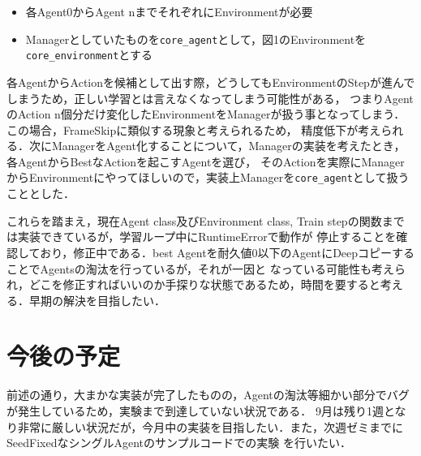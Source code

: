 \documentclass[11pt,a4paper]{jsarticle}
\begin{document}
\begin{itemize}
  \item 各Agent0からAgent nまでそれぞれにEnvironmentが必要
  \item Managerとしていたものを\texttt{core\_agent}として，図1のEnvironmentを\texttt{core\_environment}とする
\end{itemize}

各AgentからActionを候補として出す際，どうしてもEnvironmentのStepが進んでしまうため，正しい学習とは言えなくなってしまう可能性がある，
つまりAgentのAction n個分だけ変化したEnvironmentをManagerが扱う事となってしまう．この場合，FrameSkipに類似する現象と考えられるため，
精度低下が考えられる．次にManagerをAgent化することについて，Managerの実装を考えたとき，各AgentからBestなActionを起こすAgentを選び，
そのActionを実際にManagerからEnvironmentにやってほしいので，実装上Managerを\texttt{core\_agent}として扱うこととした．\par
これらを踏まえ，現在Agent class及びEnvironment class, Train stepの関数までは実装できているが，学習ループ中にRuntimeErrorで動作が
停止することを確認しており，修正中である．best Agentを耐久値0以下のAgentにDeepコピーすることでAgentsの淘汰を行っているが，それが一因と
なっている可能性も考えられ，どこを修正すればいいのか手探りな状態であるため，時間を要すると考える．早期の解決を目指したい．

\section{今後の予定}
前述の通り，大まかな実装が完了したものの，Agentの淘汰等細かい部分でバグが発生しているため，実験まで到達していない状況である．
9月は残り1週となり非常に厳しい状況だが，今月中の実装を目指したい．また，次週ゼミまでにSeedFixedなシングルAgentのサンプルコードでの実験
を行いたい．
\end{document}

